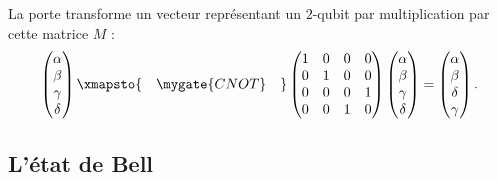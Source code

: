 \documentclass[11pt,class=report,crop=false]{standalone}
\begin{document}
La porte  transforme un vecteur représentant un $2$-qubit par multiplication par cette matrice $M$ :
$$\begin{pmatrix}\alpha\\\beta\\\gamma\\\delta\end{pmatrix} 
\xmapsto{\quad\mygate{CNOT}\quad}
 \begin{pmatrix}
 1&0&0&0\\
 0&1&0&0\\ 
 0&0&0&1\\
 0&0&1&0\\
 \end{pmatrix} 
 \begin{pmatrix}\alpha\\\beta\\\gamma\\\delta\end{pmatrix}
 = \begin{pmatrix}\alpha\\\beta\\\delta\\\gamma\end{pmatrix}.
$$

%

\subsection{L'état de Bell}
\label{ssec:bellstate}
\end{document}
